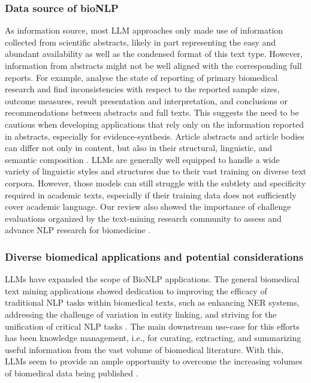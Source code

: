 \documentclass[fleqn,10pt]{olplainarticle}
\begin{document}
\subsubsection*{Data source of bioNLP}

As information source, most LLM approaches only made use of information collected from scientific abstracts, likely in part representing the easy and abundant availability as well as the condensed format of this text type. However, information from abstracts might not be well aligned with the corresponding full reports. For example, \cite{li2017scoping} analyse the state of reporting of primary biomedical research and find inconsistencies with respect to the reported sample sizes, outcome measures, result presentation and interpretation, and conclusions or recommendations between abstracts and full texts. This suggests the need to be cautious when developing applications that rely only on the information reported in abstracts, especially for evidence-synthesis. Article abstracts and article bodies can differ not only in content, but also in their structural, linguistic, and semantic composition \citep{cohen2010structural}. LLMs are generally well equipped to handle a wide variety of linguistic styles and structures due to their vast training on diverse text corpora. However, those models can still struggle with the subtlety and specificity required in academic texts, especially if their training data does not sufficiently cover academic language. Our review also showed the importance of challenge evaluations organized by the text-mining research community to assess and advance NLP research for biomedicine \citep{huang2016community}.

\subsubsection*{Diverse biomedical applications and potential considerations}

LLMs have expanded the scope of BioNLP applications. The general biomedical text mining applications showed dedication to improving the efficacy of traditional NLP tasks within biomedical texts, such as enhancing NER systems, addressing the challenge of variation in entity linking, and striving for the unification of critical NLP tasks \citep{ji2020bert,ivanisenko2022new,naseem2022benchmarking}. The main downstream use-case for this efforts has been knowledge management, i.e., for curating, extracting, and summarizing useful information from the vast volume of biomedical literature. With this, LLMs seem to provide an ample opportunity to overcome the increasing volumes of biomedical data being published \citep{bornmann2015growth,ineichen2023data}. 
\end{document}
